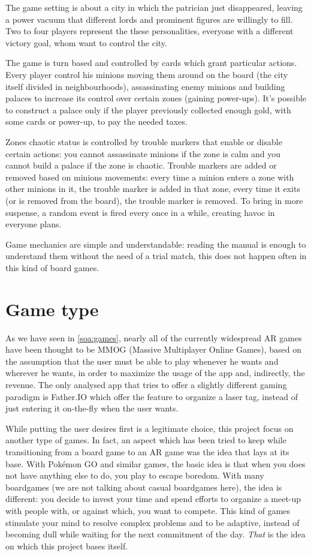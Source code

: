 		The game setting is about a city in which the patrician just disappeared, leaving a power vacuum that different lords and prominent figures are willingly to fill.
		Two to four players represent the these personalities, everyone with a different victory goal, whom want to control the city.
		
		The game is turn based and controlled by cards which grant particular actions.
		Every player control his minions moving them around on the board (the city itself divided in neighbourhoods), assassinating enemy minions and building palaces to increase its control over certain zones (gaining power-ups).
		It's possible to construct a palace only if the player previously collected enough gold, with some cards or power-up, to pay the needed taxes.
	
		Zones chaotic status is controlled by trouble markers that enable or disable certain actions: you cannot assassinate minions if the zone is calm and you cannot build a palace if the zone is chaotic. Trouble markers are added or removed based on minions movements: every time a minion enters a zone with other minions in it, the trouble marker is added in that zone, every time it exits (or is removed from the board), the trouble marker is removed.
		To bring in more suspense, a random event is fired every once in a while, creating havoc in everyone plans.
		
		Game mechanics are simple and understandable: reading the manual is enough to understand them without the need of a trial match, this does not happen often in this kind of board games.
	
	\section{Game type}
	
		As we have seen in \autoref{soa:games}, nearly all of the currently widespread AR games have been thought to be MMOG (Massive Multiplayer Online Games), based on the assumption that the user must be able to play whenever he wants and wherever he wants, in order to maximize the usage of the app and, indirectly, the revenue.
		The only analysed app that tries to offer a slightly different gaming paradigm is Father.IO which offer the feature to organize a laser tag, instead of just entering it on-the-fly when the user wants.
		
		While putting the user desires first is a legitimate choice, this project focus on another type of games.
		In fact, an aspect which has been tried to keep while transitioning from a board game to an AR game was the idea that lays at its base.
		With Pokémon GO and similar games, the basic idea is that when you does not have anything else to do, you play to escape boredom.
		With many boardgames (we are not talking about casual boardgames here), the idea is different: you decide to invest your time and spend efforts to organize a meet-up with people with, or against which, you want to compete.
		This kind of games stimulate your mind to resolve complex problems and to be adaptive, instead of becoming dull while waiting for the next commitment of the day. \emph{That} is the idea on which this project bases itself.
		
